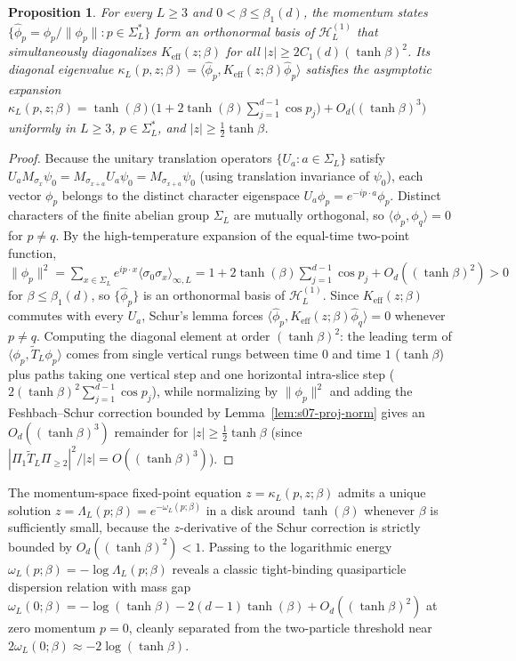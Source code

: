\documentclass[11pt]{article}
\newtheorem{proposition}[theorem]{Proposition}
\theoremstyle{definition}
\begin{document}
\begin{proposition}
\label{prop:s07-momentum-diag}
For every $L \ge 3$ and $0 < \beta \le \beta_1(d)$, the momentum states
$\{\widehat{\phi}_p = \phi_p / \|\phi_p\| : p \in \Sigma_L^*\}$ form an orthonormal
basis of $\mathcal{H}_L^{(1)}$ that simultaneously diagonalizes $K_{\mathrm{eff}}(z;
\beta)$ for all $|z| \ge 2 C_1(d) (\tanh \beta)^2$. Its diagonal eigenvalue
$\kappa_L(p, z; \beta) = \langle \widehat{\phi}_p, K_{\mathrm{eff}}(z; \beta)
\widehat{\phi}_p \rangle$ satisfies the asymptotic expansion $\kappa_L(p, z; \beta)
= \tanh(\beta) \bigl(1 + 2 \tanh(\beta) \sum_{j=1}^{d-1} \cos p_j\bigr) +
O_d\bigl((\tanh \beta)^3\bigr)$ uniformly in $L \ge 3$, $p \in \Sigma_L^*$, and $|z|
\ge \frac{1}{2} \tanh \beta$.
\end{proposition}
\begin{proof}
Because the unitary translation operators $\{U_a : a \in \Sigma_L\}$ satisfy $U_a
M_{\sigma_x} \psi_0 = M_{\sigma_{x+a}} U_a \psi_0 = M_{\sigma_{x+a}} \psi_0$ (using
translation invariance of $\psi_0$), each vector $\phi_p$ belongs to the distinct
character eigenspace $U_a \phi_p = e^{-i p \cdot a} \phi_p$. Distinct characters of
the finite abelian group $\Sigma_L$ are mutually orthogonal, so $\langle \phi_p,
\phi_q \rangle = 0$ for $p \neq q$. By the high-temperature expansion of the
equal-time two-point function, $\|\phi_p\|^2 = \sum_{x \in \Sigma_L} e^{i p \cdot x}
\langle \sigma_0 \sigma_x \rangle_{\infty, L} = 1 + 2 \tanh(\beta) \sum_{j=1}^{d-1}
\cos p_j + O_d((\tanh \beta)^2) > 0$ for $\beta \le \beta_1(d)$, so
$\{\widehat{\phi}_p\}$ is an orthonormal basis of $\mathcal{H}_L^{(1)}$. Since
$K_{\mathrm{eff}}(z; \beta)$ commutes with every $U_a$, Schur's lemma forces
$\langle \widehat{\phi}_p, K_{\mathrm{eff}}(z; \beta) \widehat{\phi}_q \rangle = 0$
whenever $p \neq q$. Computing the diagonal element at order $(\tanh \beta)^2$: the
leading term of $\langle \phi_p, \widetilde{T}_L \phi_p \rangle$ comes from single
vertical rungs between time $0$ and time $1$ ($\tanh \beta$) plus paths taking one
vertical step and one horizontal intra-slice step ($2 (\tanh \beta)^2
\sum_{j=1}^{d-1} \cos p_j$), while normalizing by $\|\phi_p\|^2$ and adding the
Feshbach--Schur correction bounded by Lemma~\ref{lem:s07-proj-norm} gives an
$O_d((\tanh \beta)^3)$ remainder for $|z| \ge \frac{1}{2} \tanh \beta$ (since
$|\Pi_1 \widetilde{T}_L \Pi_{\ge 2}|^2 / |z| = O((\tanh\beta)^3)$).
\end{proof}

The momentum-space fixed-point equation $z = \kappa_L(p, z; \beta)$ admits a unique
solution $z = \Lambda_L(p; \beta) = e^{-\omega_L(p; \beta)}$ in a disk around
$\tanh(\beta)$ whenever $\beta$ is sufficiently small, because the $z$-derivative of
the Schur correction is strictly bounded by $O_d((\tanh \beta)^2) < 1$. Passing to
the logarithmic energy $\omega_L(p; \beta) = -\log \Lambda_L(p; \beta)$ reveals a
classic tight-binding quasiparticle dispersion relation with mass gap $\omega_L(0;
\beta) = -\log(\tanh \beta) - 2(d-1) \tanh(\beta) + O_d((\tanh \beta)^2)$ at zero
momentum $p = 0$, cleanly separated from the two-particle threshold near $2
\omega_L(0; \beta) \approx -2 \log(\tanh \beta)$.
\end{document}
